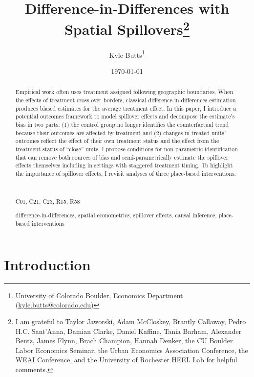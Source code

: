 \documentclass[11pt]{article}
\title{Difference-in-Differences with Spatial Spillovers\thanks{I am grateful to Taylor Jaworski, Adam McCloskey, Brantly Callaway, Pedro H.C. Sant'Anna, Damian Clarke, Daniel Kaffine, Tania Barham, Alexander Bentz, James Flynn, Brach Champion, Hannah Denker, the CU Boulder Labor Economics Seminar, the Urban Economics Association Conference, the WEAI Conference, and the University of Rochester HEEL Lab for helpful comments.}}
\author{\href{https://kylebutts.com/}{Kyle Butts}\thanks{University of Colorado Boulder, Economics Department (\href{mailto:kyle.butts@colorado.edu}{kyle.butts@colorado.edu})}}
\date{\today}
\begin{document}
\begin{titlepage}
    \maketitle

    \begin{abstract}
        {\small
        Empirical work often uses treatment assigned following geographic boundaries. When the effects of treatment cross over borders, classical difference-in-differences estimation produces biased estimates for the average treatment effect. In this paper, I introduce a potential outcomes framework to model spillover effects and decompose the estimate's bias in two parts: (1) the control group no longer identifies the counterfactual trend because their outcomes are affected by treatment and (2) changes in treated units' outcomes reflect the effect of their own treatment status and the effect from the treatment status of ``close'' units. I propose conditions for non-parametric identification that can remove both sources of bias and semi-parametrically estimate the spillover effects themselves including in settings with staggered treatment timing. To highlight the importance of spillover effects, I revisit analyses of three place-based interventions.
    
        \par~\par\noindent
         C01, C21, C23, R15, R58
        \par
         difference-in-differences, spatial econometrics, spillover effects, causal inference, place-based interventions
        \par\vspace{-2.5mm}
        }
    \end{abstract}
\end{titlepage}

\section{Introduction}
\end{document}
